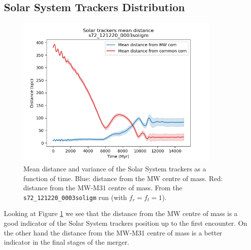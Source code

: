 \documentclass[a4paper,12pt, english]{article}
\begin{document}
\subsection{Solar System Trackers Distribution}
\label{solar-distrib}
\begin{figure}[!h]
    \centering
    \includegraphics[width=0.9\textwidth]{separation/s72_121220_0003soligm_solar_system_mean_distance.png}
    \caption{Mean distance and variance of the Solar System trackers as a function of time. Blue: distance from the MW centre of mass. Red: distance from the MW-M31 centre of mass. From the \texttt{s72\_121220\_0003soligm} run (with \(f_r = f_t = 1\)).}
    \label{fig:solar-mean-dist}
\end{figure}
Looking at Figure \ref{fig:solar-mean-dist} we see that the distance from the MW centre of mass is a good indicator of the Solar System trackers position up to the first encounter. On the other hand the distance from the MW-M31 centre of mass is a better indicator in the final stages of the merger.\par
\newpage
\end{document}
